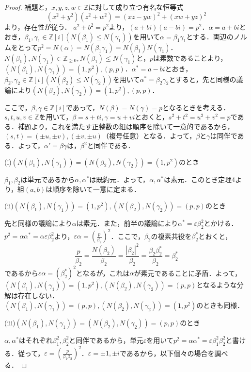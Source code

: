 \documentclass[dvipdfmx]{jsarticle}
\begin{document}
\begin{proof}補題と，$x,y,z,w\in\mathbb{Z}$に対して成り立つ有名な恒等式
$$(x^2+y^2)(z^2+w^2)=(xz-yw)^2+(xw+yz)^2$$
より，存在性が従う．
$a^2+b^2=p^2$より，$(a+bi)(a-bi)=p^2$．$\alpha=a+bi$とおき，$\beta_1,\gamma_1\in\mathbb{Z}[i](N(\beta_1)\leq N(\gamma_1))$を用いて$\alpha=\beta_1\gamma_1$とする．両辺のノルムをとって$p^2=N(\alpha)=N(\beta_1\gamma_1)=N(\beta_1)N(\gamma_1)$．$N(\beta_1),N(\gamma_1)\in\mathbb{Z}_{\geq0},N(\beta_1)\leq N(\gamma_1)$と，$p$は素数であることより，$(N(\beta_1),N(\gamma_1))=(1,p^2),(p,p)$．$\alpha^*=a-bi$とおき，$\beta_2,\gamma_2\in\mathbb{Z}[i](N(\beta_2)\leq N(\gamma_2))$を用いて$\alpha^*=\beta_2\gamma_2$とすると，先と同様の議論により$(N(\beta_2),N(\gamma_2))=(1,p^2),(p,p)$．

ここで，$\beta,\gamma\in\mathbb{Z}[i]$であって，$N(\beta)=N(\gamma)=p$となるときを考える．$s,t,u,v\in\mathbb{Z}$を用いて，$\beta=s+ti,\gamma=u+vi$とおくと，$s^2+t^2=u^2+v^2=p$である．補題より，これを満たす正整数の組は順序を除いて一意的であるから，$(s,t)=(\pm u,\pm v),(\pm v,\pm u)$（複号任意）となる．よって，$\beta$と$\gamma$は同伴である．よって，$\alpha'=\beta\gamma$は，$\beta^2$と同伴である．

(i)\quad$(N(\beta_1),N(\gamma_1))=(N(\beta_2),N(\gamma_2))=(1,p^2)$のとき

$\beta_1,\beta_2$は単元であるから$\alpha,\alpha^*$は既約元．よって，$\alpha,\alpha^*$は素元．このとき定理4より，組$(a,b)$は順序を除いて一意に定まる．

(ii)\quad$(N(\beta_1),N(\gamma_1))=(1,p^2),(N(\beta_2),N(\gamma_2))=(p,p)$のとき

先と同様の議論により$\alpha$は素元．また，前半の議論により$\alpha^*=\varepsilon\beta_2^2$とかける．$p^2=\alpha\alpha^*=\alpha\varepsilon\beta_2^2$より，$\varepsilon\alpha=\left(\frac{p}{\beta_2}\right)^2$．ここで，$\beta_2$の複素共役を$\beta_2^*$とおくと，
$$\frac{p}{\beta_2}=\frac{N(\beta_2)}{\beta_2}=\frac{|\beta_2|^2}{\beta_2}=\frac{\beta_2\beta_2^*}{\beta_2}=\beta_2^*$$
であるから$\varepsilon\alpha=(\beta_2^*)^2$となるが，これは$\alpha$が素元であることに矛盾．よって，$(N(\beta_1),N(\gamma_1))=(1,p^2),(N(\beta_2),N(\gamma_2))=(p,p)$となるような分解は存在しない．
$(N(\beta_1),N(\gamma_1))=(p,p),(N(\beta_2),N(\gamma_2))=(1,p^2)$のときも同様．

(iii)\quad$(N(\beta_1),N(\gamma_1))=(N(\beta_2),N(\gamma_2))=(p,p)$のとき

$\alpha,\alpha^*$はそれぞれ$\beta_1^2,\beta_2^2$と同伴であるから，単元$\varepsilon$を用いて$p^2=\alpha\alpha^*=\varepsilon\beta_1^2\beta_2^2$と書ける．従って，$\varepsilon=\left(\frac{p}{\beta_1\beta_2}\right)^2$．$\varepsilon=\pm1,\pm i$であるから，以下個々の場合を調べる．


\end{proof}
\end{document}
